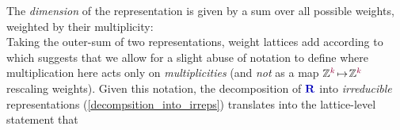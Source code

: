 \documentclass[12pt,a4paper]{article}\let\ifpdf\relax
\begin{document}
The \emph{dimension} of the representation is given by a sum over all possible weights, weighted by their multiplicity:
%
%
~\\[-10pt]



Taking the outer-sum of two representations, weight lattices add according to
%
%
which suggests that we allow for a slight abuse of notation to define
% 
%
where multiplication here acts only on \emph{multiplicities} (and \emph{not} as a map $\mathbb{Z}^{\r{k}}\!\mapsto\!\mathbb{Z}^{\r{k}}$ rescaling weights). Given this notation, the decomposition of $\mathbf{\b{R}}$ into \emph{irreducible} representations (\ref{decompsition_into_irreps}) translates into the lattice-level statement that 
%
%
\end{document}
